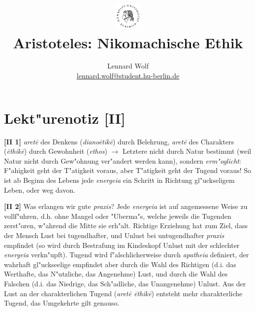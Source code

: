 \documentclass[a4paper]{article}
\date{\vspace{-3ex}}
\begin{document}
\title{
    \vspace{-30pt}
	\includegraphics*[width=0.1\textwidth,left]{ErstesSem/images/hu_logo2.png}\\
	\vspace{-10pt}
	Aristoteles: Nikomachische Ethik}
\author{Lennard Wolf\\
        \small{\href{mailto:lennard.wolf@student.hu-berlin.de}{lennard.wolf@student.hu-berlin.de}}}
\maketitle
\vspace{-4pt}

\section*{Lekt"urenotiz [II]}
\large

\textbf{[II 1]} \emph{aret\={e}} des Denkens (\emph{diano\={e}tik\={e}}) durch Belehrung, \emph{aret\={e}} des Charakters (\emph{\={e}thik\={e}}) durch Gewohnheit (\emph{ethos}) $\rightarrow$ Letztere nicht durch Natur bestimmt (weil Natur nicht durch Gew"ohnung ver"andert werden kann), sondern \emph{erm"oglicht}: F"ahigkeit geht der T"atigkeit voraus, aber T"atigkeit geht der Tugend voraus! So ist ab Beginn des Lebens jede \emph{energeia} ein Schritt in Richtung gl"uckseligem Leben, oder weg davon. \newline

\noindent \textbf{[II 2]} Was erlangen wir gute \emph{praxis}? Jede \emph{energeia} ist auf angemessene Weise zu vollf"uhren, d.h. ohne Mangel oder "Uberma"s, welche jeweils die Tugenden zerst"oren, w"ahrend die Mitte sie erh"alt. Richtige Erziehung hat zum Ziel, dass der Mensch Lust bei tugendhafter, und Unlust bei untugendhafter \emph{praxis} empfindet (so wird durch Bestrafung im Kindeskopf Unlust mit der schlechter \emph{energeia} verkn"upft). Tugend wird f"alschlicherweise durch \emph{apatheia} definiert, der wahrhaft gl"uckseelige empfindet aber durch die Wahl des Richtigen (d.i. das Werthafte, das N"utzliche, das Angenehme) Lust, und durch die Wahl des Falschen (d.i. das Niedrige, das Sch"adliche, das Unangenehme) Unlust. Aus der Lust an der charakterlichen Tugend (\emph{aret\={e} \={e}thik\={e}}) entsteht mehr charakterliche Tugend, das Umgekehrte gilt genauso.\newline
\end{document}
